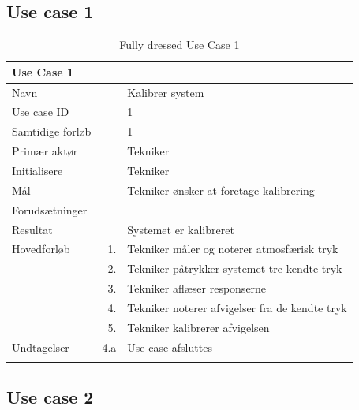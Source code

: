\subsection{Use case 1}

\begin{longtabu} to  %
    {\large \textbf{Use Case 1}} && \\
    \toprule
    Navn &&    Kalibrer system\\
    Use case ID &&    1\\
    Samtidige forløb &&    1\\
    Primær aktør &&    Tekniker\\
    Initialisere &&    Tekniker\\
    Mål && Tekniker ønsker at foretage kalibrering\\
    Forudsætninger &&  \\
    Resultat &&    Systemet er kalibreret                     \\ \midrule
    Hovedforløb &    1. &    Tekniker måler og noterer atmosfærisk tryk \\
    			&    2. &    Tekniker påtrykker systemet tre kendte tryk  \\
    			&    3. &    Tekniker aflæser responserne  \\ 
    			&    4. &    Tekniker noterer afvigelser fra de kendte tryk   \\
    			&    5. &    Tekniker kalibrerer afvigelsen  \\ \midrule 		
    Undtagelser &    4.a & Use case afsluttes \\ \bottomrule
\caption{Fully dressed Use Case 1}
\label{UC1}
\end{longtabu}

\subsection{Use case 2}

